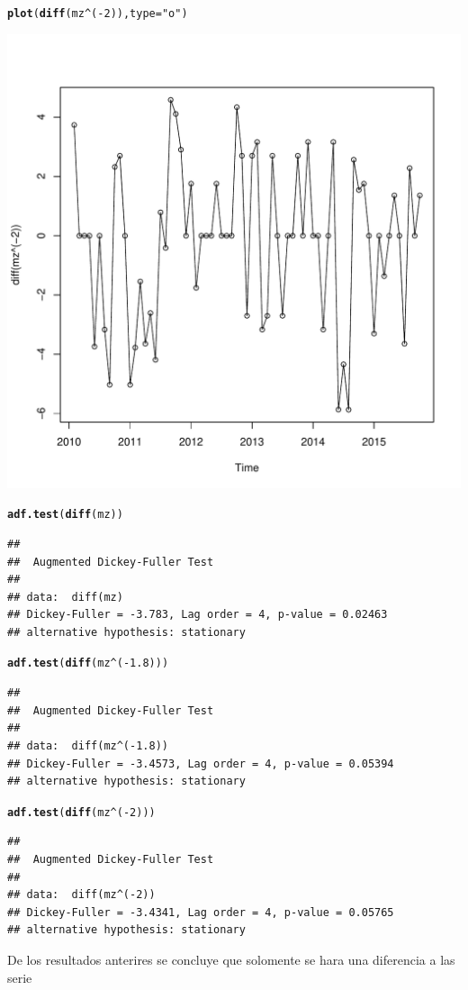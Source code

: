 \documentclass{article}\usepackage[]{graphicx}\usepackage[]{color}
\makeatletter
\def\maxwidth{ %
  \ifdim\Gin@nat@width>\linewidth
    \linewidth
  \else
    \Gin@nat@width
  \fi
}
\newcommand{\hlnum}[1]{\textcolor[rgb]{0.686,0.059,0.569}{#1}}%
\newcommand{\hlstr}[1]{\textcolor[rgb]{0.192,0.494,0.8}{#1}}%
\newcommand{\hlopt}[1]{\textcolor[rgb]{0,0,0}{#1}}%
\newcommand{\hlstd}[1]{\textcolor[rgb]{0.345,0.345,0.345}{#1}}%
\newcommand{\hlkwc}[1]{\textcolor[rgb]{0.333,0.667,0.333}{#1}}%
\newcommand{\hlkwd}[1]{\textcolor[rgb]{0.737,0.353,0.396}{\textbf{#1}}}%
\newenvironment{kframe}{%
 \def\at@end@of@kframe{}%
 \ifinner\ifhmode%
  \def\at@end@of@kframe{\end{minipage}}%
  \begin{minipage}{\columnwidth}%
 \fi\fi%
 \def\FrameCommand##1{\hskip\@totalleftmargin \hskip-\fboxsep
 \colorbox{shadecolor}{##1}\hskip-\fboxsep
     \hskip-\linewidth \hskip-\@totalleftmargin \hskip\columnwidth}%
 \MakeFramed {\advance\hsize-\width
   \@totalleftmargin\z@ \linewidth\hsize
   \@setminipage}}%
 {\par\unskip\endMakeFramed%
 \at@end@of@kframe}
\newenvironment{knitrout}{}{} %
\makeatother
\begin{document}
\begin{knitrout}
\begin{kframe}\begin{alltt}
\hlkwd{plot}\hlstd{(}\hlkwd{diff}\hlstd{(mz}\hlopt{^}\hlstd{(}\hlopt{-}\hlnum{2}\hlstd{)),}\hlkwc{type}\hlstd{=}\hlstr{"o"}\hlstd{)}
\end{alltt}
\end{kframe}
\includegraphics[width=\maxwidth]{figure/unnamed-chunk-2-5} 
\begin{kframe}\begin{alltt}
\hlkwd{adf.test}\hlstd{(}\hlkwd{diff}\hlstd{(mz))}
\end{alltt}
\begin{verbatim}
## 
## 	Augmented Dickey-Fuller Test
## 
## data:  diff(mz)
## Dickey-Fuller = -3.783, Lag order = 4, p-value = 0.02463
## alternative hypothesis: stationary
\end{verbatim}
\begin{alltt}
\hlkwd{adf.test}\hlstd{(}\hlkwd{diff}\hlstd{(mz}\hlopt{^}\hlstd{(}\hlopt{-}\hlnum{1.8}\hlstd{)))}
\end{alltt}
\begin{verbatim}
## 
## 	Augmented Dickey-Fuller Test
## 
## data:  diff(mz^(-1.8))
## Dickey-Fuller = -3.4573, Lag order = 4, p-value = 0.05394
## alternative hypothesis: stationary
\end{verbatim}
\begin{alltt}
\hlkwd{adf.test}\hlstd{(}\hlkwd{diff}\hlstd{(mz}\hlopt{^}\hlstd{(}\hlopt{-}\hlnum{2}\hlstd{)))}
\end{alltt}
\begin{verbatim}
## 
## 	Augmented Dickey-Fuller Test
## 
## data:  diff(mz^(-2))
## Dickey-Fuller = -3.4341, Lag order = 4, p-value = 0.05765
## alternative hypothesis: stationary
\end{verbatim}
\end{kframe}
\end{knitrout}
De los resultados anterires se concluye que solomente se hara una diferencia a las serie
\end{document}
